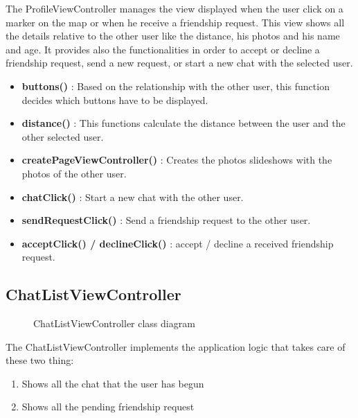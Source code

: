 The ProfileViewController manages the view displayed when the user click on a marker on the map or when he receive a friendship request. This view shows all the details relative to the other user like the distance, his photos and his name and age. It provides also the functionalities in order to accept or decline a friendship request, send a new request, or start a new chat with the selected user.

\begin{itemize}
\item \textbf{buttons()} : Based on the relationship with the other user, this function decides which buttons have to be displayed.
\item \textbf{distance()} : This functions calculate the distance between the user and the other selected user.
\item \textbf{createPageViewController()} : Creates the photos slideshows with the photos of the other user.
\item \textbf{chatClick()} : Start a new chat with the other user.
\item \textbf{sendRequestClick()} : Send a friendship request to the other user.
\item \textbf{acceptClick() / declineClick()} : accept / decline a received friendship request.
\end{itemize}

\newpage
\subsection{ChatListViewController} 


\begin{figure}[H]
\caption{ChatListViewController class diagram}
\end{figure}

The ChatListViewController implements the application logic that takes care of these two thing:

\begin{enumerate}
\item Shows all the chat that the user has begun
\item Shows all the pending friendship request
\end{enumerate}

